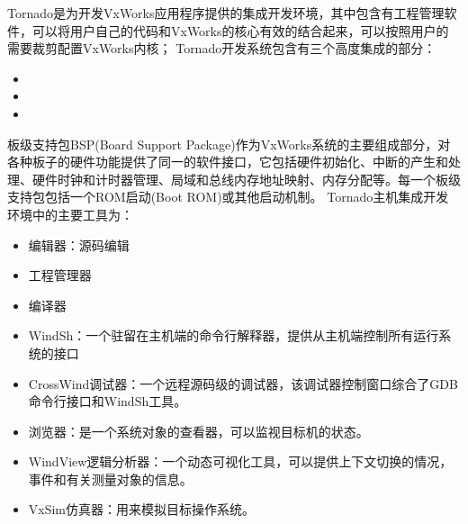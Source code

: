 	Tornado是为开发VxWorks应用程序提供的集成开发环境，其中包含有工程管理软件，可以将用户自己的代码和VxWorks的核心有效的结合起来，可以按照用户的需要裁剪配置VxWorks内核；
Tornado开发系统包含有三个高度集成的部分：
\begin{itemize}
\item {}
\item {}
\item {} 
\end{itemize}
板级支持包BSP(Board Support Package)作为VxWorks系统的主要组成部分，对各种板子的硬件功能提供了同一的软件接口，它包括硬件初始化、中断的产生和处理、硬件时钟和计时器管理、局域和总线内存地址映射、内存分配等。每一个板级支持包包括一个ROM启动(Boot ROM)或其他启动机制。
Tornado主机集成开发环境中的主要工具为：
\begin{itemize}
\item 编辑器：源码编辑
\item 工程管理器
\item 编译器
\item WindSh：一个驻留在主机端的命令行解释器，提供从主机端控制所有运行系统的接口
\item CrossWind调试器：一个远程源码级的调试器，该调试器控制窗口综合了GDB命令行接口和WindSh工具。
\item 浏览器：是一个系统对象的查看器，可以监视目标机的状态。
\item WindView逻辑分析器：一个动态可视化工具，可以提供上下文切换的情况，事件和有关测量对象的信息。
\item VxSim仿真器：用来模拟目标操作系统。
\end{itemize}



